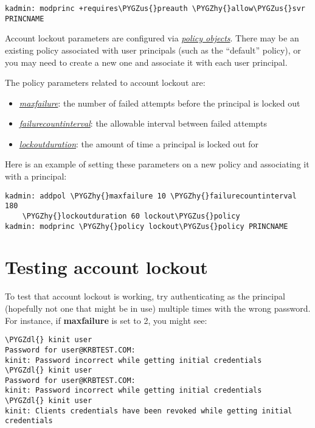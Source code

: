 \documentclass[letterpaper,10pt,english]{sphinxmanual}
\def\PYGZus{\char`\_}
\def\PYGZdl{\char`\$}
\def\PYGZhy{\char`\-}
\begin{document}
\begin{Verbatim}[commandchars=\\\{\}]
kadmin: modprinc +requires\PYGZus{}preauth \PYGZhy{}allow\PYGZus{}svr PRINCNAME
\end{Verbatim}

Account lockout parameters are configured via {\hyperref[admin/database:policies]{\emph{policy objects}}}.  There may be an existing policy associated with user
principals (such as the ``default'' policy), or you may need to create a
new one and associate it with each user principal.

The policy parameters related to account lockout are:
\begin{itemize}
\item {} 
{\hyperref[admin/database:policy-maxfailure]{\emph{maxfailure}}}: the number of failed attempts
before the principal is locked out

\item {} 
{\hyperref[admin/database:policy-failurecountinterval]{\emph{failurecountinterval}}}: the
allowable interval between failed attempts

\item {} 
{\hyperref[admin/database:policy-lockoutduration]{\emph{lockoutduration}}}: the amount of time
a principal is locked out for

\end{itemize}

Here is an example of setting these parameters on a new policy and
associating it with a principal:

\begin{Verbatim}[commandchars=\\\{\}]
kadmin: addpol \PYGZhy{}maxfailure 10 \PYGZhy{}failurecountinterval 180
    \PYGZhy{}lockoutduration 60 lockout\PYGZus{}policy
kadmin: modprinc \PYGZhy{}policy lockout\PYGZus{}policy PRINCNAME
\end{Verbatim}


\section{Testing account lockout}
\label{admin/lockout:testing-account-lockout}
To test that account lockout is working, try authenticating as the
principal (hopefully not one that might be in use) multiple times with
the wrong password.  For instance, if \textbf{maxfailure} is set to 2, you
might see:

\begin{Verbatim}[commandchars=\\\{\}]
\PYGZdl{} kinit user
Password for user@KRBTEST.COM:
kinit: Password incorrect while getting initial credentials
\PYGZdl{} kinit user
Password for user@KRBTEST.COM:
kinit: Password incorrect while getting initial credentials
\PYGZdl{} kinit user
kinit: Clients credentials have been revoked while getting initial credentials
\end{Verbatim}
\end{document}
